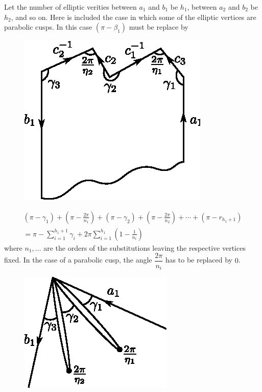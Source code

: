 Let the number of elliptic verities between $a_1$ and $b_1$ be $h_1$,  between
$a_2$ and $b_2$ be $h_2$, and so on. Here is included the case in
which some of the elliptic vertices are parabolic cusps. In this case
$(\pi - \beta_1 )$ must be replace by  
  \begin{figure}[H]
    \centerline{\includegraphics{vol9-figures/fig9-7.eps}}
  \end{figure}
\begin{gather*}
  (\pi - \gamma_1 ) + \left( \pi - \frac{2 \pi }{n_1}\right) + 
  (\pi - \gamma_2 ) + \left( \pi - \frac{2 \pi }{n_2}\right) +\cdots+ ( \pi -
  r _{h_1 + 1})\\ 
  = \pi - \sum_{ i = 1} ^{ h_1 + 1}\gamma_i + 2 \pi \sum_ { i = 1
  }^{ h_1  }  \left(1 - \frac{1}{n_i}\right) 
\end{gather*}\pageoriginale
where $n_1, \ldots $ are the orders of the substitutions leaving the
respective vertices fixed. In the case of a parabolic cusp, the angle
$\dfrac{2 \pi}{n_i}$ has to be replaced by $0$.  
  \begin{figure}[H]
    \centerline{\includegraphics{vol9-figures/fig9-8.eps}}
  \end{figure}

